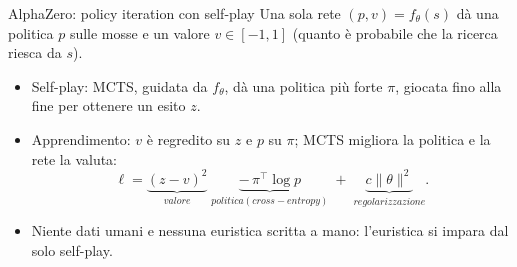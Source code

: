 \documentclass[aspectratio=169]{beamer}
\newcommand{\T}[2]{#2}
\newcommand{\T}[2]{#1}
\begin{document}
\begin{frame}{\T{AlphaZero: self-play policy iteration}{AlphaZero: policy iteration con self-play}}
  \T{A single network $(p,v)=f_\theta(s)$ gives a policy $p$ over the moves and a value
  $v\in[-1,1]$ (how likely the search is to succeed from $s$).}%
  {Una sola rete $(p,v)=f_\theta(s)$ d\`a una politica $p$ sulle mosse e un valore
  $v\in[-1,1]$ (quanto \`e probabile che la ricerca riesca da $s$).}
  \begin{itemize}
    \item \T{Self-play: MCTS, guided by $f_\theta$, gives a stronger policy $\pi$, played to
          the end to obtain an outcome $z$.}%
          {Self-play: MCTS, guidata da $f_\theta$, d\`a una politica pi\`u forte $\pi$, giocata
          fino alla fine per ottenere un esito $z$.}
    \item \T{Learning: $v$ is regressed on $z$ and $p$ on $\pi$; MCTS improves the policy and
          the network evaluates it:}%
          {Apprendimento: $v$ \`e regredito su $z$ e $p$ su $\pi$; MCTS migliora la politica e la
          rete la valuta:}
      \[
        \ell=\underbrace{(z-v)^2}_{\T{value}{valore}}\;\underbrace{-\,\pi^{\!\top}\!\log p}_{\T{policy (cross-entropy)}{politica (cross-entropy)}}\;+\;\underbrace{c\lVert\theta\rVert^2}_{\T{regularization}{regolarizzazione}} .
      \]
    \item \T{No human data and no hand-made heuristic: the heuristic is learned from
          self-play alone.}%
          {Niente dati umani e nessuna euristica scritta a mano: l'euristica si impara dal solo
          self-play.}
  \end{itemize}
\end{frame}
\end{document}
